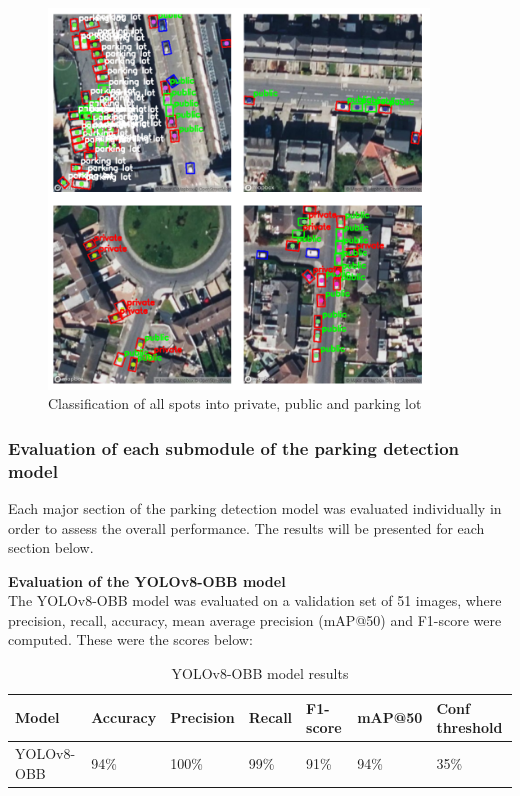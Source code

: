 \begin{figure}[htbp]
  \centering
  \includegraphics[width=0.9\textwidth]{images/classification-cars.png}
  \caption{Classification of all spots into private, public and parking lot}
  \label{fig:classification_all_spots}
\end{figure}

\newpage{}

\subsubsection{Evaluation of each submodule of the parking detection model}
Each major section of the parking detection model was evaluated individually in
order to assess the overall performance. The results will be presented for each
section below.

\textbf{Evaluation of the YOLOv8-OBB model}\\
The YOLOv8-OBB model was evaluated on a validation set of 51 images, where
precision, recall, accuracy, mean average precision (mAP@50) and F1-score were
computed. These were the scores below:
\begin{table}[htbp]
  \centering
  \begin{tabular}{|p{}|p{}|p{}|p{}|p{}|p{}|p{}|}
    \hline
    \textbf{Model} & \textbf{Accuracy} & \textbf{Precision} & \textbf{Recall} & \textbf{F1-score} & \textbf{mAP@50} & \textbf{Conf threshold} \\
    \hline
    YOLOv8-OBB     & 94\%              & 100\%              & 99\%            & 91\%              & 94\%            & 35\%                    \\
    \hline
  \end{tabular}
  \caption{YOLOv8-OBB model results}
\end{table}

